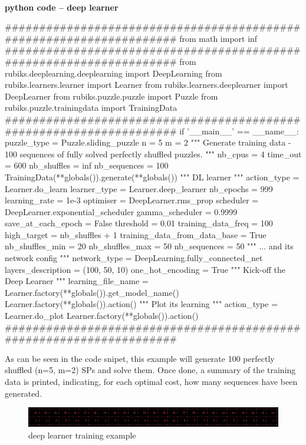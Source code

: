 \paragraph{}{\textbf{python code -- deep learner}}
\begin{python}
####################################################################
from math import inf
####################################################################
from rubiks.deeplearning.deeplearning import DeepLearning
from rubiks.learners.learner import Learner
from rubiks.learners.deeplearner import DeepLearner
from rubiks.puzzle.puzzle import Puzzle
from rubiks.puzzle.trainingdata import TrainingData
####################################################################
if '__main__' == __name__:
    puzzle_type = Puzzle.sliding_puzzle
    n = 5
    m = 2
    """ Generate training data - 100 sequences of fully 
    solved perfectly shuffled puzzles. 
    """
    nb_cpus = 4
    time_out = 600
    nb_shuffles = inf
    nb_sequences = 100
    TrainingData(**globals()).generate(**globals())
    """ DL learner """
    action_type = Learner.do_learn
    learner_type = Learner.deep_learner
    nb_epochs = 999
    learning_rate = 1e-3
    optimiser = DeepLearner.rms_prop
    scheduler = DeepLearner.exponential_scheduler
    gamma_scheduler = 0.9999
    save_at_each_epoch = False
    threshold = 0.01
    training_data_freq = 100
    high_target = nb_shuffles + 1
    training_data_from_data_base = True
    nb_shuffles_min = 20
    nb_shuffles_max = 50
    nb_sequences = 50
    """ ... and its network config """
    network_type = DeepLearning.fully_connected_net
    layers_description = (100, 50, 10)
    one_hot_encoding = True
    """ Kick-off the Deep Learner """
    learning_file_name = Learner.factory(**globals()).get_model_name()
    Learner.factory(**globals()).action()
    """ Plot its learning """
    action_type = Learner.do_plot
    Learner.factory(**globals()).action()
####################################################################
\end{python}
\black

As can be seen in the code snipet, this example will generate 100 perfectly shuffled (n=5, m=2) SPs and solve them. Once done, a summary of the training data is printed, indicating, for each optimal cost, how many sequences have been generated.

\begin{figure}[H]
\centering
\includegraphics[scale=0.45]{./Figures/exampledeeplearnertraining}
\caption[Examples]{deep learner training example}
\label{fig:exampledeeplearnertraining}
\end{figure}


